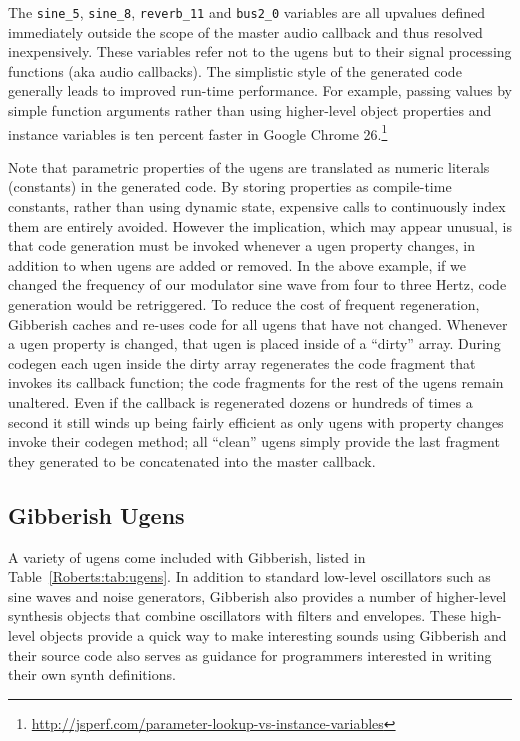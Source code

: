 The \texttt{sine\_5}, \texttt{sine\_8}, \texttt{reverb\_11} and \texttt{bus2\_0} variables are all upvalues defined immediately outside the scope of the master audio callback and thus resolved inexpensively. These variables refer not to the ugens but to their signal processing functions (aka audio callbacks). The simplistic style of the generated code generally leads to improved run-time performance. For example, passing values by simple function arguments rather than using higher-level object properties and instance variables is ten percent faster in Google Chrome 26.\footnote{\url{http://jsperf.com/parameter-lookup-vs-instance-variables}}

Note that parametric properties of the ugens are translated as numeric literals (constants) in the generated code. By storing properties as compile-time constants, rather than using dynamic state, expensive calls to continuously index them are entirely avoided. However the implication, which may appear unusual, is that code generation must be invoked whenever a ugen property changes, in addition to when ugens are added or removed. In the above example, if we changed the frequency of our modulator sine wave from four to three Hertz, code generation would be retriggered. To reduce the cost of frequent regeneration, Gibberish caches and re-uses code for all ugens that have not changed. Whenever a ugen property is changed, that ugen is placed inside of a ``dirty'' array. During codegen each ugen inside the dirty array regenerates the code fragment that invokes its callback function; the code fragments for the rest of the ugens remain unaltered. Even if the callback is regenerated dozens or hundreds of times a second it still winds up being fairly efficient as only ugens with property changes invoke their codegen method; all ``clean'' ugens simply provide the last fragment they generated to be concatenated into the master callback. 

\subsection{Gibberish Ugens}
A variety of ugens come included with Gibberish, listed in Table~\ref{Roberts:tab:ugens}. In addition to standard low-level oscillators such as sine waves and noise generators, Gibberish also provides a number of higher-level synthesis objects that combine oscillators with filters and envelopes. These high-level objects provide a quick way to make interesting sounds using Gibberish and their source code also serves as guidance %
for programmers interested in writing their own synth definitions.

